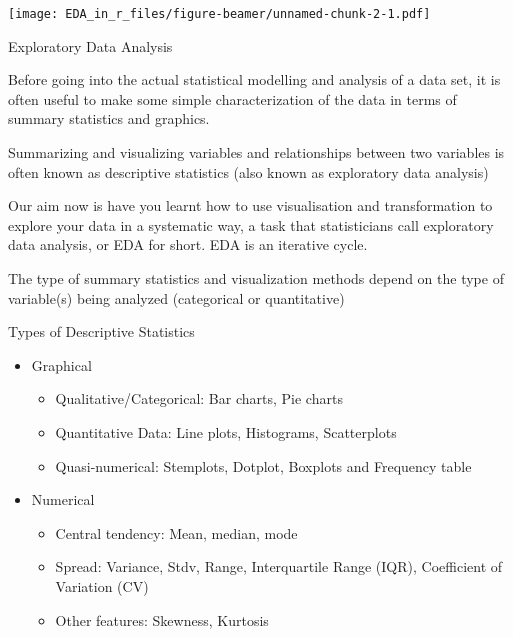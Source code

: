 \documentclass[ignorenonframetext,]{beamer}
\begin{document}
\begin{frame}

\texttt{[image: EDA\_in\_r\_files/figure-beamer/unnamed-chunk-2-1.pdf]}

\end{frame}

\begin{frame}{Exploratory Data Analysis}

Before going into the actual statistical modelling and analysis of a
data set, it is often useful to make some simple characterization of the
data in terms of summary statistics and graphics.

Summarizing and visualizing variables and relationships between two
variables is often known as {descriptive statistics} (also known as
exploratory data analysis)

Our aim now is have you learnt how to use visualisation and
transformation to explore your data in a systematic way, a task that
statisticians call exploratory data analysis, or EDA for short. EDA is
an iterative cycle.

The type of summary statistics and visualization methods depend on the
type of variable(s) being analyzed (categorical or quantitative)

\end{frame}

\begin{frame}{Types of Descriptive Statistics}

\begin{itemize}
\item
  Graphical

  \begin{itemize}
  \item
    Qualitative/Categorical: Bar charts, Pie charts
  \item
    Quantitative Data: Line plots, Histograms, Scatterplots
  \item
    Quasi-numerical: Stemplots, Dotplot, Boxplots and Frequency table
  \end{itemize}
\item
  Numerical

  \begin{itemize}
  \item
    Central tendency: Mean, median, mode
  \item
    Spread: Variance, Stdv, Range, Interquartile Range (IQR),
    Coefficient of Variation (CV)
  \item
    Other features: Skewness, Kurtosis
  \end{itemize}
\end{itemize}

\end{frame}
\end{document}
